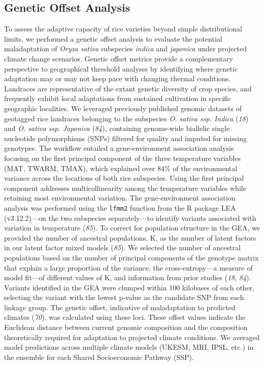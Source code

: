 \documentclass[
  letterpaper,
  DIV=11,
  numbers=noendperiod]{scrartcl}
\begin{document}
\subsection{Genetic Offset Analysis}\label{genetic-offset-analysis}

To assess the adaptive capacity of rice varieties beyond simple
distributional limits, we performed a genetic offset analysis to
evaluate the potential maladaptation of \emph{Oryza sativa} subspecies
\emph{indica} and \emph{japonica} under projected climate change
scenarios. Genetic offset metrics provide a complementary perspective to
geographical threshold analyses by identifying where genetic adaptation
may or may not keep pace with changing thermal conditions. Landraces are
representative of the extant genetic diversity of crop species, and
frequently exhibit local adaptations from sustained cultivation in
specific geographic localities. We leveraged previously published
genomic datasets of geotagged rice landraces belonging to the subspecies
\emph{O. sativa ssp. Indica} (\emph{18}) and \emph{O. sativa ssp.
Japonica} (\emph{84}), containing genome-wide biallelic single
nucleotide polymorphisms (SNPs) filtered for quality and imputed for
missing genotypes. The workflow entailed a gene-environment association
analysis focusing on the first principal component of the three
temperature variables (MAT, TWARM, TMAX), which explained over 84\% of
the environmental variance across the locations of both rice subspecies.
Using the first principal component addresses multicollinearity among
the temperature variables while retaining most environmental variation.
The gene-environment association analysis was performed using the
\texttt{lfmm2} function from the R package LEA (v3.12.2)---on the two
subspecies separately---to identify variants associated with variation
in temperature (\emph{85}). To correct for population structure in the
GEA, we provided the number of ancestral populations, K, as the number
of latent factors in our latent factor mixed models (\emph{85}). We
selected the number of ancestral populations based on the number of
principal components of the genotype matrix that explain a large
proportion of the variance, the cross-entropy---a measure of model
fit---of different values of K, and information from prior studies
(\emph{18}, \emph{84}). Variants identified in the GEA were clumped
within 100 kilobases of each other, selecting the variant with the
lowest p-value as the candidate SNP from each linkage group. The genetic
offset, indicative of maladaptation to predicted climates (\emph{70}),
was calculated using these loci. These offset values indicate the
Euclidean distance between current genomic composition and the
composition theoretically required for adaptation to projected climate
conditions. We averaged model predictions across multiple climate models
(UKESM, MRI, IPSL, etc.) in the ensemble for each Shared Socioeconomic
Pathway (SSP).
\end{document}
